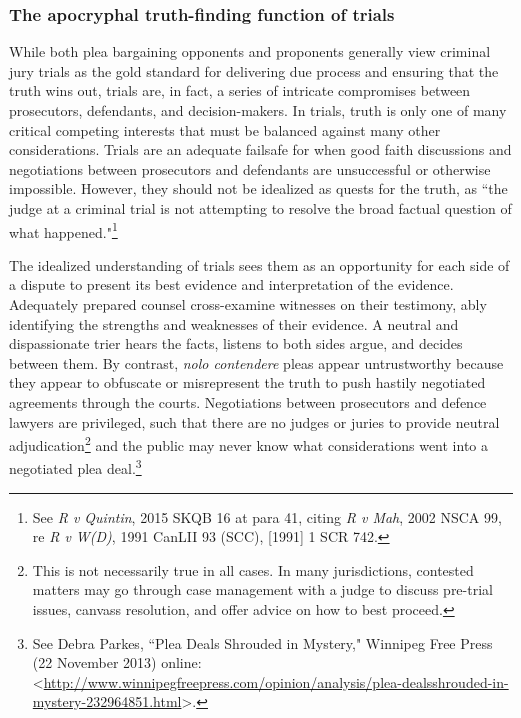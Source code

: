 \subsubsection{The apocryphal truth-finding function of trials}

While both plea bargaining opponents and proponents generally view criminal jury trials as the gold standard for delivering due process and ensuring that the truth wins out, trials are, in fact, a series of intricate compromises between prosecutors, defendants, and decision-makers. In trials, truth is only one of many critical competing interests that must be balanced against many other considerations. Trials are an adequate failsafe for when good faith discussions and negotiations between prosecutors and defendants are unsuccessful or otherwise impossible. However, they should not be idealized as quests for the truth, as ``the judge at a criminal trial is not attempting to resolve the broad factual question of what happened."\footnote{See \textit{R v Quintin}, 2015 SKQB 16 at para 41, citing \textit{R v Mah}, 2002 NSCA 99, re \textit{R v W(D)}, 1991 CanLII 93 (SCC), [1991] 1 SCR 742.}

The idealized understanding of trials sees them as an opportunity for each side of a dispute to present its best evidence and interpretation of the evidence. Adequately prepared counsel cross-examine witnesses on their testimony, ably identifying the strengths and weaknesses of their evidence. A neutral and dispassionate trier hears the facts, listens to both sides argue, and decides between them. By contrast, \textit{nolo contendere} pleas appear untrustworthy because they appear to obfuscate or misrepresent the truth to push hastily negotiated agreements through the courts. Negotiations between prosecutors and defence lawyers are privileged, such that there are no judges or juries to provide neutral adjudication\footnote{This is not necessarily true in all cases. In many jurisdictions, contested matters may go through case management with a judge to discuss pre-trial issues, canvass resolution, and offer advice on how to best proceed.} and the public may never know what considerations went into a negotiated plea deal.\footnote{See Debra Parkes, ``Plea Deals Shrouded in Mystery," Winnipeg Free Press (22 November 2013) online: \textless \url{http://www.winnipegfreepress.com/opinion/analysis/plea-dealsshrouded-in-mystery-232964851.html}\textgreater.}

